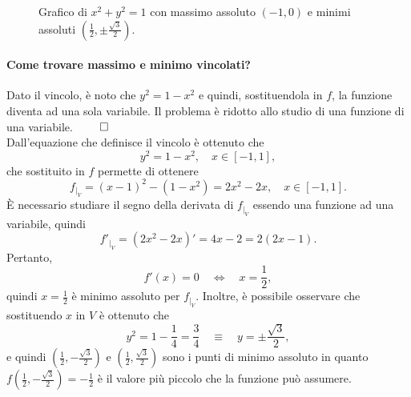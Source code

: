 \begin{example}
\begin{figure}[ht]
		\caption{Grafico di $x^2+y^2=1$ con massimo assoluto $(-1,0)$ e minimi assoluti $\left(\frac{1}{2}, \pm\frac{\sqrt{3}}{2}\right)$.}
		\label{fig:vincolo_metodo_lagrange}
	\end{figure}
	\paragraph{Come trovare massimo e minimo vincolati?} Dato il vincolo, è noto che $y^2 = 1 - x^2$ e quindi, sostituendola in $f$, la funzione diventa ad una sola variabile. Il problema è ridotto allo studio di una funzione di una variabile. $\qed$\\
	Dall'equazione che definisce il vincolo è ottenuto che
	\begin{equation*}
		y^2 = 1 - x^2,\quad x\in[-1,1],
	\end{equation*}
	che sostituito in $f$ permette di ottenere
	\begin{equation*}
		f_{|_V} = (x-1)^2 - (1-x^2) = 2x^2 - 2x,\quad x\in[-1,1].
	\end{equation*}
	È necessario studiare il segno della derivata di $f_{|_V}$ essendo una funzione ad una variabile, quindi
	\begin{equation*}
		f'_{|_V} = (2x^2 - 2x)' = 4x - 2 = 2(2x - 1).
	\end{equation*}
	Pertanto,
	\begin{equation*}
		f'(x) = 0\quad\iff\quad x = \frac{1}{2},
	\end{equation*}
	quindi $x=\frac{1}{2}$ è minimo assoluto per $f_{|_V}$. Inoltre, è possibile osservare che sostituendo $x$ in $V$ è ottenuto che
	\begin{equation*}
		y^2 = 1 - \frac{1}{4} = \frac{3}{4}\quad\equiv\quad y = \pm\frac{\sqrt{3}}{2},
	\end{equation*}
	e quindi $\left(\frac{1}{2}, -\frac{\sqrt{3}}{2}\right)$ e $\left(\frac{1}{2}, \frac{\sqrt{3}}{2}\right)$ sono i punti di minimo assoluto in quanto $f\left(\frac{1}{2}, -\frac{\sqrt{3}}{2}\right) = -\frac{1}{2}$ è il valore più piccolo che la funzione può assumere.\\

\end{example}
